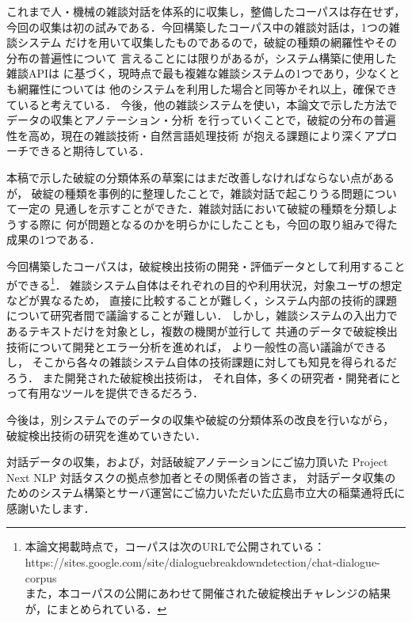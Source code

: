 \documentclass[japanese]{jnlp_1.4}
\renewcommand{\mod}[1]{}
\begin{document}
これまで人・機械の雑談対話を体系的に収集し，整備したコーパスは存在せず，
今回の収集は初の試みである．今回構築したコーパス中の雑談対話は，1つの雑談システム
だけを用いて収集したものであるので，破綻の種類の網羅性やその分布の普遍性について
言えることには限りがあるが，システム構築に使用した雑談APIは\cite{higashinaka-EtAl:2014:Coling}
に基づく，現時点で最も複雑な雑談システムの1つであり，少なくとも網羅性については
他のシステムを利用した場合と同等かそれ以上，確保できていると考えている．
今後，他の雑談システムを使い，本論文で示した方法でデータの収集とアノテーション・分析
を行っていくことで，破綻の分布の普遍性を高め，現在の雑談技術・自然言語処理技術
が抱える課題により深くアプローチできると期待している．

本稿で示した破綻の分類体系の草案にはまだ改善しなければならない点があるが，
破綻の種類を事例的に整理したことで，雑談対話で起こりうる問題について一定の
見通しを示すことができた．雑談対話において破綻の種類を分類しようする際に
何が問題となるのかを明らかにしたことも，今回の取り組みで得た成果の1つである．

今回構築したコーパスは，破綻検出技術の開発・評価データとして利用することができる\footnote{本論文掲載時点で，コーパスは次のURLで公開されている：\\ https://sites.google.com/site/dialoguebreakdowndetection/chat-dialogue-corpus\\
また，本コーパスの公開にあわせて開催された破綻検出チャレンジの結果が，\cite{higashinaka-EtAl:2015:DBD}にまとめられている．}．
雑談システム自体はそれぞれの目的や利用状況，対象ユーザの想定などが異なるため，
直接に比較することが難しく，システム内部の技術的課題について研究者間で議論することが難しい．
しかし，雑談システムの入出力であるテキストだけを対象とし，複数の機関が並行して
共通のデータで破綻検出技術について開発とエラー分析を進めれば，
より一般性の高い議論ができるし，
そこから各々の雑談システム自体の技術課題に対しても知見を得られるだろう．
また開発された破綻検出技術は，
それ自体，多くの研究者・開発者にとって有用なツールを提供できるだろう．

今後は，別システムでのデータの収集や破綻の分類体系の改良を行いながら，
破綻検出技術の研究を進めていきたい．


    \acknowledgment

対話データの収集，および，対話破綻アノテーションにご協力頂いた
Project Next NLP 対話タスクの拠点参加者とその関係者の皆さま，
対話データ収集のためのシステム構築とサーバ運営にご協力いただいた広島市立大の稲葉通将氏に感謝いたします．
\mod{システム構築には株式会社NTTドコモの雑談対話APIを使わせていただきました．}
\end{document}
